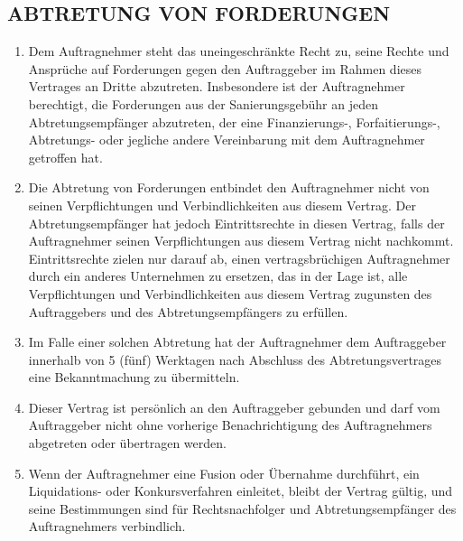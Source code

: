 \begin{multicols}{2}
   \subsection{ABTRETUNG VON FORDERUNGEN}
   \begin{enumerate}
   \item Dem Auftragnehmer steht das uneingeschränkte Recht zu, seine Rechte und Ansprüche auf Forderungen gegen den Auftraggeber im Rahmen dieses Vertrages an Dritte abzutreten. Insbesondere ist der Auftragnehmer berechtigt, die Forderungen aus der Sanierungsgebühr an jeden Abtretungsempfänger abzutreten, der eine Finanzierungs-, Forfaitierungs-, Abtretungs- oder jegliche andere Vereinbarung mit dem Auftragnehmer getroffen hat.
   \item Die Abtretung von Forderungen entbindet den Auftragnehmer nicht von seinen Verpflichtungen und Verbindlichkeiten aus diesem Vertrag. Der Abtretungsempfänger hat jedoch Eintrittsrechte in diesen Vertrag, falls der Auftragnehmer seinen Verpflichtungen aus diesem Vertrag nicht nachkommt. Eintrittsrechte zielen nur darauf ab, einen vertragsbrüchigen Auftragnehmer durch ein anderes Unternehmen zu ersetzen, das in der Lage ist, alle Verpflichtungen und Verbindlichkeiten aus diesem Vertrag zugunsten des Auftraggebers und des Abtretungsempfängers zu erfüllen.
   \item Im Falle einer solchen Abtretung hat der Auftragnehmer dem Auftraggeber innerhalb von 5 (fünf) Werktagen nach Abschluss des Abtretungsvertrages eine Bekanntmachung zu übermitteln.
   \item Dieser Vertrag ist persönlich an den Auftraggeber gebunden und darf vom Auftraggeber nicht ohne vorherige Benachrichtigung des Auftragnehmers abgetreten oder übertragen werden.
   \item Wenn der Auftragnehmer eine Fusion oder Übernahme durchführt, ein Liquidations- oder Konkursverfahren einleitet, bleibt der Vertrag gültig, und seine Bestimmungen sind für Rechtsnachfolger und Abtretungsempfänger des Auftragnehmers verbindlich.
   \end{enumerate}


\end{multicols}
